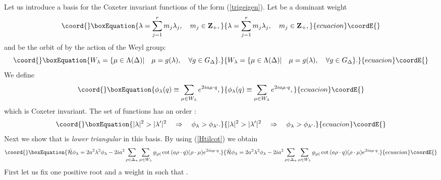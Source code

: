 \documentclass[a4paper,12pt]{article}
\begin{document}
Let us introduce a basis for the Coxeter invariant
functions of the form (\ref{trigeigen}). Let \myHighlight{\(\lambda\)}\coordHE{} be a
dominant weight
\begin{equation}\coord{}\boxEquation{
   \lambda=\sum_{j=1}^rm_j\lambda_j,\quad m_j\in{\bf Z}_+,
}{
   \lambda=\sum_{j=1}^rm_j\lambda_j,\quad m_j\in{\bf Z}_+,
}{ecuacion}\coordE{}\end{equation}
and \coordHE{} be the orbit of \myHighlight{\(\lambda\)}\coordHE{}
by the action of the Weyl group:
\begin{equation}\coord{}\boxEquation{
   W_{\lambda}=\{\mu\in\Lambda(\Delta)|\quad \mu=g(\lambda),\quad
   \forall g\in G_{\Delta}\}.
}{
   W_{\lambda}=\{\mu\in\Lambda(\Delta)|\quad \mu=g(\lambda),\quad
   \forall g\in G_{\Delta}\}.
}{ecuacion}\coordE{}\end{equation}
We define
\begin{equation}\coord{}\boxEquation{
   \phi_{\lambda}(q)\equiv\sum_{\mu\in W_{\lambda}}e^{2ia\mu\cdot q},
}{
   \phi_{\lambda}(q)\equiv\sum_{\mu\in W_{\lambda}}e^{2ia\mu\cdot q},
}{ecuacion}\coordE{}\end{equation}
which is Coxeter invariant. The set of functions
\myHighlight{\(\{\phi_{\lambda}\}\)}\coordHE{}  has an order
\myHighlight{\(>\)}\coordHE{}:
\begin{equation}\coord{}\boxEquation{
   |\lambda|^2>|\lambda^\prime|^2\quad
   \Rightarrow\quad \phi_{\lambda}>\phi_{\lambda^\prime}.
}{
   |\lambda|^2>|\lambda^\prime|^2\quad
   \Rightarrow\quad \phi_{\lambda}>\phi_{\lambda^\prime}.
}{ecuacion}\coordE{}\end{equation}
Next we show that \coordHE{} is {\em lower triangular\/}
in this basis. By using (\ref{Htilcot}) we obtain
\begin{equation}\coord{}\boxEquation{
   \tilde{\cal H}\phi_{\lambda}=2a^2\lambda^2\phi_{\lambda}
   -2ia^2\sum_{\rho\in\Delta_+}\sum_{\mu\in
   W_{\lambda}}{g_{|\rho|}\cot{(a\rho\cdot q)}}
   (\rho\cdot\mu) e^{2ia\mu\cdot q}.
   \label{Htillam}
}{
   \tilde{\cal H}\phi_{\lambda}=2a^2\lambda^2\phi_{\lambda}
   -2ia^2\sum_{\rho\in\Delta_+}\sum_{\mu\in
   W_{\lambda}}{g_{|\rho|}\cot{(a\rho\cdot q)}}
   (\rho\cdot\mu) e^{2ia\mu\cdot q}.
   }{ecuacion}\coordE{}\end{equation}
First let us fix one positive root \myHighlight{\(\rho\)}\coordHE{} and a weight \myHighlight{\(\mu\)}\coordHE{}
in \coordHE{}
such that \coordHE{}.
\end{document}
